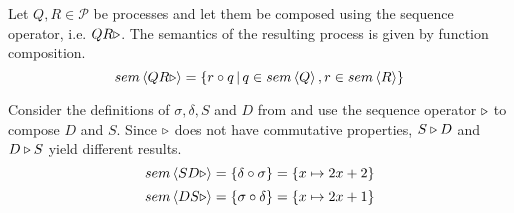 \begin{definition}
\label{def:sem_sequence}
Let $Q, R \in \mathcal{P}$ be processes and let them be composed using the sequence operator, i.e. $Q \sequence R$. The semantics of the resulting process is given by function composition.
  \begin{equation}
    \label{eqn:sem_sequence}
    sem \left\langle Q R \triangleright \right\rangle = \left\{ r \circ q \,|\, q \in sem \left\langle Q \right\rangle, r \in sem \left\langle R \right\rangle \right\}
  \end{equation}
  \hfill\qedsymbol
\end{definition}

\begin{example}
\label{exp:sem_sequence}
Consider the definitions of $\sigma, \delta, S$ and $D$ from  and use the sequence operator $\triangleright$ to compose $D$ and $S$. Since $\triangleright$ does not have commutative properties, $S \triangleright D$ and $D \triangleright S$ yield different results.
  \begin{equation}
    sem \left\langle S D \triangleright \right\rangle = \left\{ \delta \circ \sigma \right\} = \left\{ x \mapsto 2x+2 \right\}
  \end{equation}
  \begin{equation}
    sem \left\langle D S \triangleright \right\rangle = \left\{ \sigma \circ \delta \right\} = \left\{ x \mapsto 2x+1 \right\}
  \end{equation}
  \hfill\qedsymbol
\end{example}



